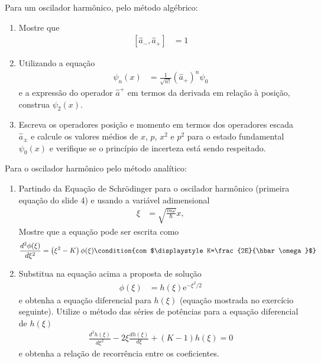 \begin{prob}
	Para um oscilador harmônico, pelo método algébrico:
	\begin{enumerate}[label=\alph *)]
		\item Mostre que
			\begin{align}
				\left[\hat{a}_{-},\hat{a}_{+}\right] &= 1
			\end{align}
		\item Utilizando a equação
			\begin{align}
				\psi_n(x) &= \frac{1}{\sqrt{n!}}\left(\hat{a}_{+}\right)^{n}\psi_{0}
			\end{align}
			e a expressão do operador $\hat{a}^{+}$ em termos da derivada em relação à posição, construa $\psi_{2}(x)$.
		\item Escreva os operadores posição e momento em termos dos operadores escada $\hat{a}_{\pm}$ e calcule os valores médios de $x$, $p$, $x^{2}$ e $p^{2}$ para o estado fundamental $\psi_{0}(x)$ e verifique se o princípio de incerteza está sendo respeitado.
	\end{enumerate}
	\begin{sol}

	\end{sol}
\end{prob}
\begin{prob}
	Para o oscilador harmônico pelo método analítico:
	\begin{enumerate}[label=\alph *)]
		\item Partindo da Equação de Schrödinger para o oscilador harmônico (primeira equação do slide 4) e usando a variável adimensional
			\begin{align}
				\xi &= \sqrt{\frac{m \omega}{\hbar}}x,
			\end{align}
			Mostre que a equação pode ser escrita como
			\begin{dmath*}
				\frac{d^{2} \phi(\xi)}{d \xi^{2}} = \left(\xi^{2}-K\right) \phi(\xi)\condition{com $\displaystyle K=\frac{2E}{\hbar \omega}$}
			\end{dmath*}
		\item Substitua na equação acima a proposta de solução
			\begin{align}
				\phi(\xi) &= h(\xi)\mathrm{e}^{-\xi^{2}/2}
			\end{align}
			e obtenha a equação diferencial para $h(\xi)$ (equação mostrada no exercício seguinte).
			Utilize o método das séries de potências para a equação diferencial de $h(\xi)$
			\begin{align}
				\frac{d^{2}h(\xi)}{d \xi^{2}}-2 \xi \frac{dh(\xi)}{d \xi}+\left(K-1\right)h(\xi)=0
			\end{align}
			e obtenha a relação de recorrência entre os coeficientes.
	\end{enumerate}
	\begin{sol}

	\end{sol}
\end{prob}
